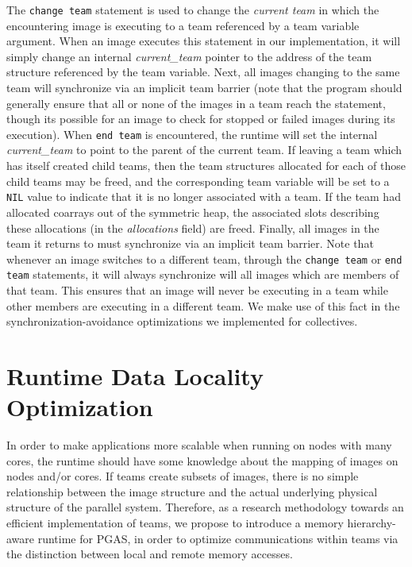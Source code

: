 The \texttt{change team} statement is used to change the \textit{current team}
in which the encountering image is executing to a team referenced by a team
variable argument. When an image executes this statement in our
implementation, it will simply change an internal \textit{current\_team}
pointer to the address of the team structure referenced by the team variable.
Next, all images changing to the same team will synchronize via an implicit
team barrier (note that the program should generally ensure that
all or none of the images in a team reach the statement, though its possible
for an image to check for stopped or failed images during its execution). When
\texttt{end team} is encountered, the runtime will set the internal
\textit{current\_team} to point to the parent of the current team. If leaving
a team which has itself created child teams, then the team structures
allocated for each of those child teams may be freed, and the corresponding
team variable will be set to a \texttt{NIL} value to indicate that it is no
longer associated with a team. If the team had allocated coarrays out of the
symmetric heap, the associated slots describing these allocations (in the
\textit{allocations} field) are freed.  Finally, all images in the team it
returns to must synchronize via an implicit team barrier. Note that whenever
an image switches to a different team, through the \texttt{change team} or
\texttt{end team} statements, it will always synchronize will all images which
are members of that team. This ensures that an image will never be executing
in a team while other members are executing in a different team. We make use
of this fact in the synchronization-avoidance optimizations we implemented for
collectives.

\section{Runtime Data Locality Optimization}
In order to make applications more scalable when running on nodes with many cores, the runtime should have some knowledge about the mapping of images on nodes and/or  cores.  If teams create subsets of images, there is no simple relationship between the image structure and the actual  underlying physical structure of the parallel system. Therefore, as a research methodology towards an efficient implementation of  teams, we propose to introduce a memory hierarchy-aware runtime for PGAS, in order to optimize communications within teams via the distinction between local and remote memory accesses.


